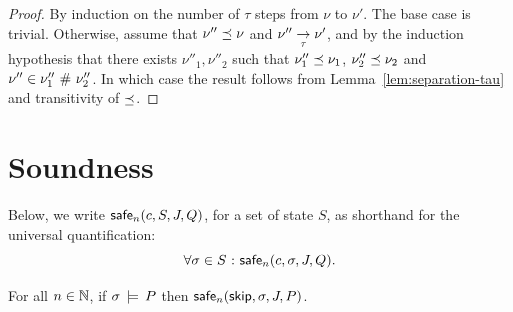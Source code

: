 \documentclass[11pt]{report}
\begin{document}
\begin{proof}
  By induction on the number of $\tau$ steps from $\nu$ to $\nu'$. The base case is trivial. Otherwise, assume that $\nu'' \preceq \nu$ and $\nu'' \underset{\tau}{\rightarrow} \nu'$, and by the induction hypothesis that there exists $\nu''_1,\nu''_2$ such that $\nu''_1 \preceq \nu_1$, $\nu''_2 \preceq \nu_2$ and $\nu'' \in \nu''_1 \operatorname{\,\#\,} \nu''_2$. In which case the result follows from Lemma~\ref{lem:separation-tau} and transitivity of $\preceq$.
\end{proof}

\section{Soundness}
\label{sec:soundness-proofs}
Below, we write $\mathsf{safe}_{n}(c,S,J,Q)$, for a set of state $S$, as shorthand for the universal quantification: \[ \forall \sigma \in S \operatorname{\,:\,} \mathsf{safe}_{n}(c,\sigma,J,Q).\]

\begin{lemma}
	\label{lem:skip-safe}
	For all $n \in \mathbb{N}$, if $\sigma \,\models\, P$ then $\mathsf{safe}_{n}(\operatorname{\mathsf{skip}},\sigma,J,P)$. 
\end{lemma}
\end{document}
